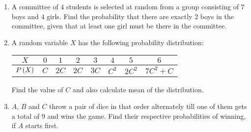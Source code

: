 \begin{enumerate}
\item A committee of $4$ students is selected at random from a group consisting of $7$ boys and $4$ girls. Find the probability that there are exactly $2$ boys in the committee, given that at least one girl must be there in the committee.
\item A random variable $X$ has the following probability distribution:
	\begin{center}
	\begin{tabular}{|c|c|c|c|c|c|c|c|}
	\hline
	$X$ & $0$ & $1$ & $2$ & $3$ & $4$ & $5$ & $6$\\
	\hline
	$P\left(X\right)$ & $C$ & $2C$ & $2C$ & $3C$ & $C^2$ & $2C^2$ & $7C^2+C$\\
	\hline
	\end{tabular}
	\end{center}
Find the value of $C$ and also calculate mean of the distribution.
\item $A$, $B$ and $C$ throw a pair of dice in that order alternately till one of them gets a total of $9$ and wins the game. Find their respective probabilities of winning, if $A$ starts first.

\end{enumerate}
